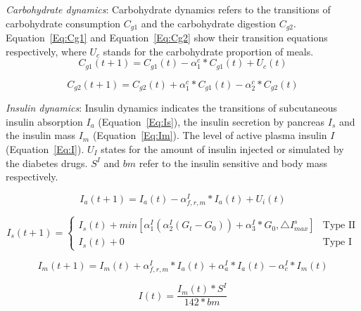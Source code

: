 

\emph{Carbohydrate dynamics}: Carbohydrate dynamics refers to the transitions of carbohydrate consumption  $C_{g1}$ and the carbohydrate digestion $C_{g2}$. 
Equation~\ref{Eq:Cg1}  and Equation~\ref{Eq:Cg2} show their transition equations respectively, where $U_{c}$ stands for the carbohydrate proportion of meals.
\begin{equation}\label{Eq:Cg1}
C_{g1}(t+1)=C_{g1}(t)-\alpha_{1}^c*C_{g1}(t)+U_{c}(t)
\end{equation}

\begin{equation}\label{Eq:Cg2}
C_{g2}(t+1)=C_{g2}(t)+\alpha_{1}^c*C_{g1}(t)-\alpha_{2}^c*C_{g2}(t)
\end{equation}

\emph{Insulin dynamics}: Insulin dynamics indicates the transitions of subcutaneous insulin absorption $I_{a}$ (Equation~\ref{Eq:Is}), 
the insulin secretion by pancreas $I_{s}$ and  the insulin mass $I_{m}$ (Equation~\ref{Eq:Im}). The level of active plasma insulin $I$ (Equation~\ref{Eq:I}). $U_{I}$ 
states for the amount of insulin injected or simulated by the diabetes drugs. $S^I$ and $bm$ refer to the insulin sensitive 
and body mass respectively.

\begin{equation}\label{Eq:Is}
I_{a}(t+1)=I_{a}(t)-\alpha_{f,r,m}^I*I_{a}(t)+U_{i}(t)
\end{equation}


\begin{equation}\label{Eq:Isec}
    I_{s}(t+1)=
   \begin{cases}
    I_{s}(t)+min[\alpha_1^I(\alpha_2^I(G_t-G_0))+\alpha_3^I*G_0, \triangle I_{max}^{s}] &\mbox{Type II}\\
    I_{s}(t)+0 &\mbox{Type I}
   \end{cases}
  \end{equation}

\begin{equation}\label{Eq:Im}
I_{m}(t+1)=I_{m}(t)+\alpha_{f,r,m}^I*I_{a}(t)+\alpha_{a}^I*I_{a}(t)-\alpha_c^I*I_{m}(t)
\end{equation}


\begin{equation}\label{Eq:I}
I(t)=\frac{I_{m}(t)*S^I}{142*bm}
\end{equation}

